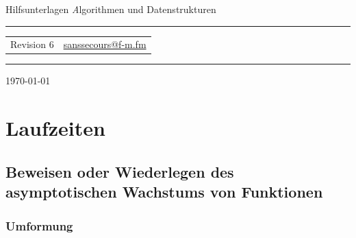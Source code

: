 \documentclass[a4paper, 12pt]{article}
\makeatletter
\newcommand{\TITLE}{Hilfsunterlagen}
\newcommand{\TITLEDESCRIPTION}{Algorithmen und Datenstrukturen}
\newcommand{\REVISION}{6}
\newcommand{\MAILONE}{\href{mailto:sanssecours@f-m.fm}{sanssecours@f-m.fm}}
\makeatother
\begin{document}
\begin{titlepage}
	\begin{center}
		{\Huge\zapfino \TITLE}
		\vskip 1cm
		{\Large\textit\TITLEDESCRIPTION}
		\vskip 2cm
		\hrule
		\vskip 0.5cm
		\begin{tabular}{p{8cm}l}
			Revision \REVISION	& \MAILONE\\
		\end{tabular}
		\vskip 0.5cm
		\hrule
		\vskip 11cm
	\end{center}
	\begin{flushright}
		\today
	\end{flushright}
\end{titlepage}


\makeatletter \renewcommand{\@dotsep}{10000} \makeatother
\newpage
\setcounter{page}{2}
\tableofcontents
\newpage
\pagestyle{scrheadings}


\begin{abstract}
	\noindent Dieser Text ist mit der Absicht entstanden zu helfen. Ich habe ihn somit natürlich nicht aus Absicht mit Fehlern gespickt. Trotzdem ist es doch sehr wahrscheinlich, dass er Fehler enthält. Ich bitte das zu Entschuldigen, und möchte damit den Hinweis geben, dass für jeglichen Inhalt dieses Textes \emph{absolut kein Gewähr auf Richtigkeit} gegeben wird.\\

	\noindent Solltet ihr Fehler im Text finden wäre es sehr nett wenn ihr mir eine \href{mailto:sanssecours@f-m.fm}{e-Mail} schreibt, damit ich sie ausbessern kann.
\end{abstract}

\section{Laufzeiten}

\subsection{Beweisen oder Wiederlegen des asymptotischen Wachstums von Funktionen}

\subsubsection{Umformung}
\end{document}
